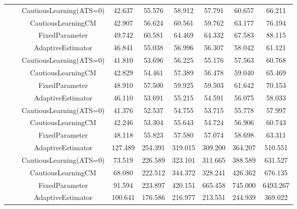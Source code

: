 \begin{table}[!h]
\begin{tabular}[t]{ccccccccc}
 &  & CautiousLearning(ATS=0) & 42.637 & 55.576 & 58.912 & 57.791 & 60.657 & 66.211\\

 &  & CautiousLearningCM & 42.907 & 56.624 & 60.561 & 59.762 & 63.177 & 76.194\\

 & \multirow[t]{-4}{*}{\centering\arraybackslash 1.00} & FixedParameter & 49.742 & 60.581 & 64.469 & 64.332 & 67.583 & 88.115\\
\cmidrule{2-9}
 &  & AdaptiveEstimator & 46.841 & 55.038 & 56.996 & 56.307 & 58.042 & 61.121\\

 &  & CautiousLearning(ATS=0) & 41.810 & 53.696 & 56.225 & 55.176 & 57.563 & 60.768\\

 &  & CautiousLearningCM & 42.829 & 54.461 & 57.389 & 56.478 & 59.040 & 65.469\\

 & \multirow[t]{-4}{*}{\centering\arraybackslash 1.25} & FixedParameter & 48.910 & 57.500 & 59.925 & 59.503 & 61.642 & 70.153\\
\cmidrule{2-9}
 &  & AdaptiveEstimator & 46.110 & 53.691 & 55.215 & 54.591 & 56.075 & 58.033\\

 &  & CautiousLearning(ATS=0) & 41.376 & 52.537 & 54.755 & 53.715 & 55.778 & 57.997\\

 &  & CautiousLearningCM & 42.246 & 53.304 & 55.643 & 54.724 & 56.906 & 60.743\\

\multirow[t]{-28}{*}{\centering\arraybackslash 50} & \multirow[t]{-4}{*}{\centering\arraybackslash 1.50} & FixedParameter & 48.118 & 55.823 & 57.580 & 57.074 & 58.698 & 63.311\\
\cmidrule{1-9}
 &  & AdaptiveEstimator & 127.489 & 254.391 & 319.015 & 309.200 & 364.207 & 510.551\\

 &  & CautiousLearning(ATS=0) & 73.519 & 226.589 & 323.101 & 311.665 & 388.589 & 631.527\\

 &  & CautiousLearningCM & 68.080 & 222.512 & 344.372 & 328.241 & 426.362 & 676.135\\

 & \multirow[t]{-4}{*}{\centering\arraybackslash 0.25} & FixedParameter & 91.594 & 223.897 & 420.151 & 665.458 & 745.000 & 6493.267\\
\cmidrule{2-9}
 &  & AdaptiveEstimator & 100.641 & 176.586 & 216.977 & 213.551 & 244.939 & 369.022\\


\end{tabular}
\end{table}
